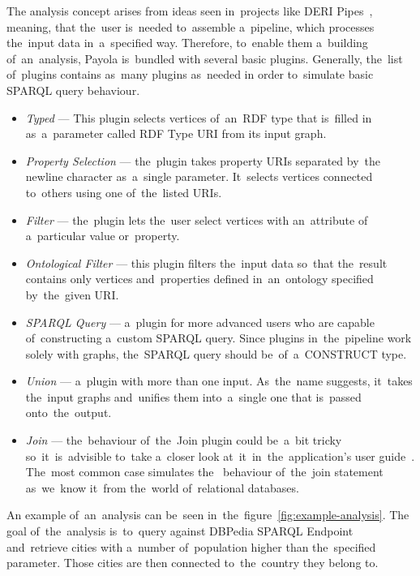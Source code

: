 The analysis concept arises from ideas seen in~projects like DERI 
Pipes~\cite{deri-pipes}, meaning, that the~user is~needed to~assemble a~pipeline,
which processes the~input data in~a~specified way. Therefore, to~enable them a~building of~an~analysis, Payola is~bundled with several basic 
plugins. Generally, the~list of~plugins contains as~many plugins as~needed
in order to~simulate basic SPARQL query behaviour.

\begin{itemize}
  \item \emph{Typed} --- This plugin selects vertices of~an~RDF type that is~filled in
  as~a~parameter called RDF Type URI from its input graph.
  
  \item \emph{Property Selection} --- the~plugin takes property URIs separated by~the
  newline character as~a~single parameter. It~selects vertices connected
  to~others using one of~the~listed URIs.
  
  \item \emph{Filter} --- the~plugin lets the~user select vertices with an~attribute of
  a~particular value or~property.
 
  \item \emph{Ontological Filter} --- this plugin filters the~input data so~that the~result contains only vertices and~properties defined in~an~ontology specified 
  by~the~given URI.
  
  \item \emph{SPARQL Query} --- a~plugin for more advanced users who are capable of~constructing a~custom SPARQL query. Since plugins in~the~pipeline work solely with 
  graphs, the~SPARQL query should be~of~a~CONSTRUCT type.
  
  \item \emph{Union} --- a~plugin with more than one input. As~the~name suggests, it~takes 
  the~input graphs and~unifies them into~a~single one that is~passed onto~the~output.
  
  \item \emph{Join} --- the~behaviour of~the~Join plugin could be~a~bit tricky so~it~is~advisible
  to~take a~closer look at~it~in~the~application's 
  user guide~\cite{payola:ug:join-plugin}. The~most common case simulates the~  behaviour of~the~join statement as~we~know it~from the~world of~relational 
  databases.
  
\end{itemize}

An example of~an~analysis can be~seen in~the~figure~\ref{fig:example-analysis}.
The goal of~the~analysis is~to~query against DBPedia SPARQL Endpoint and~retrieve cities with a~number of~population higher than the~specified parameter. 
Those cities are then connected to~the~country they belong to.

